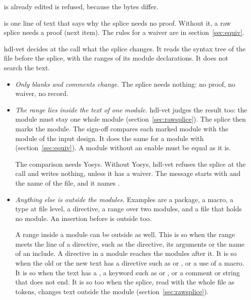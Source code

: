 \begin{entry}{}
  is already edited is refused, because the bytes differ.
\item[Waiver]  is one line of text that says why the splice needs no proof.
  Without it, a raw splice needs a proof (next item). The rules for a waiver are in
  section~\ref{sec:equiv}.
\item[Proof] hdl-vet decides at the call what the splice changes. It reads the syntax tree
  of the file before the splice, with the ranges of its module declarations. It does not
  search the text.
  \begin{itemize}
  \item \emph{Only blanks and comments change.} The splice needs nothing: no proof, no
    waiver, no record.
  \item \emph{The range lies inside the text of one module.} hdl-vet judges the result too:
    the module must stay one whole module (section~\ref{sec:rawsplice}). The splice then
    marks the module.
    The sign-off compares each marked module with the module of the input design. It does
    the same for a module with 
    (section~\ref{sec:equiv}). A module without an enable must be equal as it is.

    The comparison needs Yosys. Without Yosys, hdl-vet refuses the splice at the call and
    writes nothing, unless it has a waiver. The message starts with  and the
    name of the file, and it names .
  \item \emph{Anything else is outside the modules.} Examples are a package, a macro, a
    type at file level, a directive, a range over two modules, and a file that holds no
    module. An insertion before  is outside too.

    A range inside a module can be outside as well. This is so when the range meets the line
    of a directive, such as the directive, its arguments or the name of an include. A directive
    in a module reaches the modules after it. It is so when the old or the new text
    has a directive such as  or , or a use of a macro. It is so when
    the text has a , a keyword such as  or , or a comment or
    string that does not end. It is so too when the splice, read with the whole file as
    tokens, changes text outside the module (section~\ref{sec:rawsplice}).


\end{itemize}
\end{entry}
